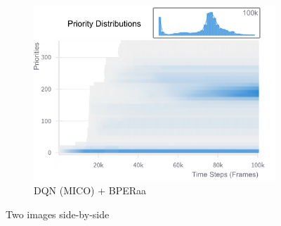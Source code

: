 \begin{figure}[h]
\begin{subfigure}{0.32\textwidth}
        \includegraphics[width=\linewidth]{Results/grid_world/priority_distribution_dqn_mico_bperaa.png}
        \caption{DQN (MICO) + BPERaa}
        \label{fig:uniform_weighting}
    \end{subfigure}
    \caption{Two images side-by-side}
    \label{fig:outdated_priorities}
\end{figure}



